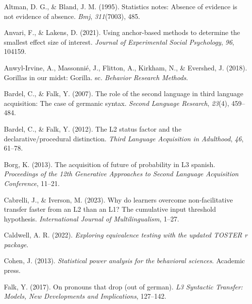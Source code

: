 \documentclass[
  man,floatsintext]{apa6}
\newlength{\cslhangindent}
\newlength{\cslentryspacingunit} %
\newenvironment{CSLReferences}[2] %
 {%
  \setlength{\parindent}{0pt}
  \ifodd #1
  \let\oldpar\par
  \def\par{\hangindent=\cslhangindent\oldpar}
  \fi
  \setlength{\parskip}{#2\cslentryspacingunit}
 }%
 {}
\begin{document}
\hypertarget{refs}{}
\begin{CSLReferences}{1}{0}
\leavevmode{}%
Altman, D. G., \& Bland, J. M. (1995). Statistics notes: Absence of evidence is not evidence of absence. \emph{Bmj}, \emph{311}(7003), 485.

\leavevmode{}%
Anvari, F., \& Lakens, D. (2021). Using anchor-based methods to determine the smallest effect size of interest. \emph{Journal of Experimental Social Psychology}, \emph{96}, 104159.

\leavevmode{}%
Anwyl-Irvine, A., Massonnié, J., Flitton, A., Kirkham, N., \& Evershed, J. (2018). Gorillas in our midst: Gorilla. sc. \emph{Behavior Research Methods}.

\leavevmode{}%
Bardel, C., \& Falk, Y. (2007). The role of the second language in third language acquisition: The case of germanic syntax. \emph{Second Language Research}, \emph{23}(4), 459--484.

\leavevmode{}%
Bardel, C., \& Falk, Y. (2012). The L2 status factor and the declarative/procedural distinction. \emph{Third Language Acquisition in Adulthood}, \emph{46}, 61--78.

\leavevmode{}%
Borg, K. (2013). The acquisition of future of probability in L3 spanish. \emph{Proceedings of the 12th Generative Approaches to Second Language Acquisition Conference}, 11--21.

\leavevmode{}%
Cabrelli, J., \& Iverson, M. (2023). Why do learners overcome non-facilitative transfer faster from an L2 than an L1? The cumulative input threshold hypothesis. \emph{International Journal of Multilingualism}, 1--27.

\leavevmode{}%
Caldwell, A. R. (2022). \emph{Exploring equivalence testing with the updated TOSTER r package}.

\leavevmode{}%
Cohen, J. (2013). \emph{Statistical power analysis for the behavioral sciences}. Academic press.

\leavevmode{}%
Falk, Y. (2017). On pronouns that drop (out of german). \emph{L3 Syntactic Transfer: Models, New Developments and Implications}, 127--142.


\end{CSLReferences}
\end{document}
